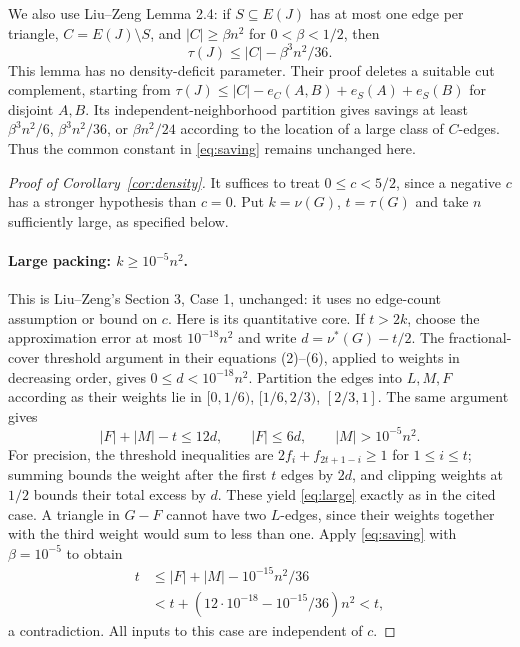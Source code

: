 \documentclass[11pt]{article}
\begin{document}
We also use Liu--Zeng Lemma 2.4: if $S\subseteq E(J)$ has at most one
edge per triangle, $C=E(J)\setminus S$, and $|C|\ge\beta n^2$ for
$0<\beta<1/2$, then
\begin{equation}\label{eq:saving}
\tau(J)\le |C|-\beta^3n^2/36.
\end{equation}
This lemma has no density-deficit parameter. Their proof deletes a
suitable cut complement, starting from
$\tau(J)\le|C|-e_C(A,B)+e_S(A)+e_S(B)$ for disjoint $A,B$.
Its independent-neighborhood partition gives savings at least
$\beta^3n^2/6$, $\beta^3n^2/36$, or $\beta n^2/24$ according to the
location of a large class of $C$-edges. Thus the common constant in
\eqref{eq:saving} remains unchanged here.

\begin{proof}[Proof of Corollary~\ref{cor:density}]
It suffices to treat $0\le c<5/2$, since a negative $c$ has a stronger
hypothesis than $c=0$. Put $k=\nu(G)$, $t=\tau(G)$ and take $n$
sufficiently large, as specified below.

\paragraph{Large packing: $k\ge10^{-5}n^2$.}
This is Liu--Zeng's Section 3, Case 1, unchanged: it uses no edge-count
assumption or bound on $c$. Here is its quantitative core. If $t>2k$,
choose the approximation error at most $10^{-18}n^2$ and write
$d=\nu^*(G)-t/2$. The fractional-cover threshold argument in their
equations (2)--(6), applied to weights in decreasing order, gives
$0\le d<10^{-18}n^2$. Partition the edges into $L,M,F$ according as
their weights lie in $[0,1/6)$, $[1/6,2/3)$, $[2/3,1]$. The same
argument gives
\begin{equation}\label{eq:large}
|F|+|M|-t\le12d,\qquad |F|\le6d,\qquad |M|>10^{-5}n^2.
\end{equation}
For precision, the threshold inequalities are
$2f_i+f_{2t+1-i}\ge1$ for $1\le i\le t$; summing bounds the weight
after the first $t$ edges by $2d$, and clipping weights at $1/2$ bounds
their total excess by $d$. These yield \eqref{eq:large} exactly as in
the cited case. A triangle in $G-F$ cannot have two $L$-edges, since
their weights together with the third weight would sum to less than one.
Apply \eqref{eq:saving} with $\beta=10^{-5}$ to obtain
\begin{equation}\label{eq:contradiction}
\begin{aligned}
t&\le |F|+|M|-10^{-15}n^2/36\\
 &<t+(12\cdot10^{-18}-10^{-15}/36)n^2<t,
\end{aligned}
\end{equation}
a contradiction. All inputs to this case are independent of $c$.


\end{proof}
\end{document}
